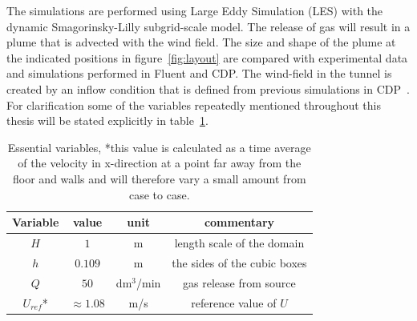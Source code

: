 The simulations are performed using Large Eddy Simulation (LES) 
with the dynamic Smagorinsky-Lilly subgrid-scale model. 
The release of gas will result in a plume that is advected with the wind field. The size and 
shape of the plume at the indicated positions in figure~\ref{fig:layout} are compared with 
experimental data and simulations performed in Fluent and CDP\@. 
The wind-field in the tunnel is created by an inflow condition that is defined from previous 
simulations in CDP~\cite{eriksson}.
For clarification some of the variables repeatedly mentioned throughout this thesis will be 
stated explicitly in table~\ref{tab:simplevariables}.
\begin{table}
    \centering
    \begin{tabular}{c c c c}
        Variable & value & unit & commentary \\ \hline
        $H$   & $1$ & m & length scale of the domain \\ 
        $h$   & $0.109$ & m & the sides of the cubic boxes\\ 
        $Q$   & $50$ & dm$^3$/min & gas release from source \\ 
        $U_{ref} $*& $\approx1.08$ & m/s & reference value of $U$ \\
    \end{tabular}
    \caption{Essential variables, *this value is calculated as a time average of the velocity in 
        x-direction at a point far away from the floor and walls and will therefore 
        vary a small amount from case to case. }
    \label{tab:simplevariables}
\end{table}

